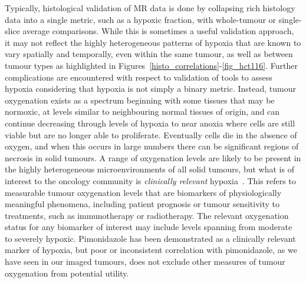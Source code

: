 Typically, histological validation of MR data is done by collapsing rich histology data into a single metric, such as a hypoxic fraction, with whole-tumour or single-slice average comparisons.
While this is sometimes a useful validation approach, it may not reflect the highly heterogeneous patterns of hypoxia that are known to vary spatially and temporally, even within the same tumour, as well as between tumour types as highlighted in Figures~\ref{histo_correlations}-\ref{fig_hct116}. 
Further complications are encountered with respect to validation of tools to assess hypoxia considering that hypoxia is not simply a binary metric. Instead, tumour oxygenation exists as a spectrum beginning with some tissues that may be normoxic, at levels similar to neighbouring normal tissues of origin, and can continue decreasing through levels of hypoxia to near anoxia where cells are still viable but are no longer able to proliferate.
Eventually cells die in the absence of oxygen, and when this occurs in large numbers there can be significant regions of necrosis in solid tumours. 
A range of oxygenation levels are likely to be present in the highly heterogeneous microenvironments of all solid tumours, but what is of interest to the oncology community is \emph{clinically relevant} hypoxia~\cite{Horsman:2012kw}.
This refers to measurable tumour oxygenation levels that are biomarkers of physiologically meaningful phenomena, including patient prognosis or tumour sensitivity to treatments, such as immunotherapy or radiotherapy. The relevant oxygenation status for any biomarker of interest may include levels spanning from moderate to severely hypoxic. 
Pimonidazole has been demonstrated as a clinically relevant marker of hypoxia, but poor or inconsistent correlation with pimonidazole, as we have seen in our imaged tumours, does not exclude other measures of tumour oxygenation from potential utility.

